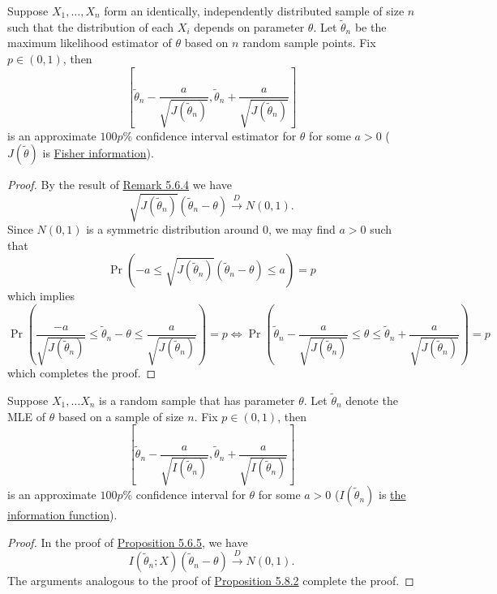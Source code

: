 \documentclass[11pt,fleqn]{book} %
\begin{document}
\begin{proposition} \label{prop:582}
Suppose \(X_1, \ldots, X_n\) form an identically, independently distributed sample of size \(n\) such that the distribution of each \(X_i\) depends on parameter \(\theta\). Let \(\tilde{\theta}_n\) be the maximum likelihood estimator of \(\theta\) based on \(n\) random sample points. Fix \(p \in (0, 1)\), then 
\[
\left[\tilde{\theta}_n - \frac{a}{\sqrt{J(\tilde{\theta}_n)}}, \tilde{\theta}_n + \frac{a}{\sqrt{J(\tilde{\theta}_n)}}\right]
\]
is an approximate \(100p\%\) confidence interval estimator for \(\theta\) for some \(a > 0\) (\(J(\tilde{\theta})\) is \hyperref[def:534]{Fisher information}).
\end{proposition}
\begin{proof}
By the result of \hyperref[rmk:564]{Remark 5.6.4} we have
\[
\sqrt{J(\tilde{\theta}_n)}(\tilde{\theta}_n - \theta) \xrightarrow{D} N(0, 1).
\]
\indent Since \(N(0, 1)\) is a symmetric distribution around 0, we may find \(a > 0\) such that
\[
\Pr(-a \leq \sqrt{J(\tilde{\theta}_n)}(\tilde{\theta}_n - \theta) \leq a) = p
\]
which implies
\[
\Pr\left(\frac{-a}{\sqrt{J(\tilde{\theta}_n)}} \leq \tilde{\theta}_n - \theta \leq \frac{a}{\sqrt{J(\tilde{\theta}_n)}}\right) = p
\Leftrightarrow
\Pr\left(\tilde{\theta}_n - \frac{a}{\sqrt{J(\tilde{\theta}_n)}} \leq \theta \leq \tilde{\theta}_n + \frac{a}{\sqrt{J(\tilde{\theta}_n)}}\right) = p
\]
which completes the proof.
\end{proof}

\begin{corollary} \label{cor:583}
Suppose \(X_1, \ldots X_n\) is a random sample that has parameter \(\theta\). Let \(\tilde{\theta}_n\) denote the MLE of \(\theta\) based on a sample of size \(n\). Fix \(p \in (0, 1)\), then
\[
\left[\tilde{\theta}_n - \frac{a}{\sqrt{I(\tilde{\theta}_n)}}, \tilde{\theta}_n + \frac{a}{\sqrt{I(\tilde{\theta}_n)}}\right]
\]
is an approximate \(100p\%\) confidence interval for \(\theta\) for some \(a > 0\) (\(I(\tilde{\theta}_n)\) is \hyperref[def:532]{the information function}).
\end{corollary}
\begin{proof} In the proof of \hyperref[prop:565]{Proposition 5.6.5}, we have
\[
I(\tilde{\theta}_n; X)(\tilde{\theta}_n - \theta) \xrightarrow{D} N(0, 1).
\]
\indent The arguments analogous to the proof of \hyperref[prop:582]{Proposition 5.8.2} complete the proof.
\end{proof}
\end{document}
